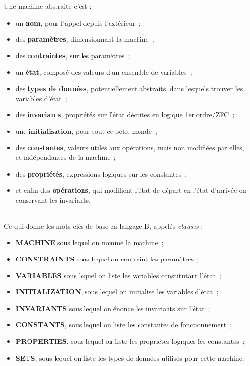 \documentclass[10pt,a4paper]{article}
\begin{document}
Une machine abstraite c'est :
\\
\begin{itemize}
\item un \textbf{nom}, pour l'appel depuis l'extérieur~;
\\
\item des \textbf{paramètres}, dimensionnant la machine~;
\item des \textbf{contraintes}, sur les paramètres~;
\\
\item un \textbf{état}, composé des valeurs d'un ensemble de variables~;
\item des \textbf{types de données}, potentiellement abstraits, dans lesquels trouver les variables d'état~;
\item des \textbf{invariants}, propriétés sur l'état décrites en logique 1er ordre/ZFC~;
\item une \textbf{initialisation}, pour tout ce petit monde~;
\\
\item des \textbf{constantes}, valeurs utiles aux opérations, mais non modifiées par elles, et indépendantes de la machine~;
\item des \textbf{propriétés}, expressions logiques sur les constantes~;
\\
\item et enfin des \textbf{opérations}, qui modifient l'état de départ en l'état d'arrivée en conservant les invariants.
\end{itemize}
\ \\
Ce qui donne les mots clés de base en langage B, appelés \emph{clauses} :
\begin{itemize}
\item \textbf{MACHINE} sous lequel on nomme la machine~;
\item \textbf{CONSTRAINTS} sous lequel on contraint les paramètres~;
\item \textbf{VARIABLES} sous lequel on liste les variables constitutant l'état~;
\item \textbf{INITIALIZATION}, sous lequel on initialise les variables d'état~;
\item \textbf{INVARIANTS} sous lequel on énonce les invariants sur l'état~;
\item \textbf{CONSTANTS}, sous lequel on liste les constantes de fonctionnement~;
\item \textbf{PROPERTIES}, sous lequel on liste les propriétés logiques les constantes~;
\item \textbf{SETS}, sous lequel on liste les types de données utilisés pour cette machine.
\end{itemize}
\end{document}
